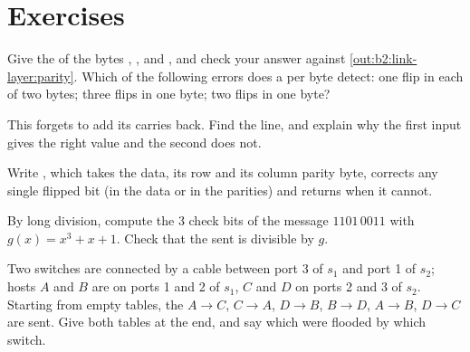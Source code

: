 
\section{Exercises}\label{sec:b2:link-layer:exercises}

\begin{exercise}[$\star$]\label{exo:b2:link-layer:1}
Give the  of the bytes , ,  and , and check your answer
against \cref{out:b2:link-layer:parity}. Which of the following errors does a  per byte detect: one flip in
each of two bytes; three flips in one byte; two flips in one byte?
\end{exercise}

\begin{exercise}[$\star$]\label{exo:b2:link-layer:2}
This  forgets to add its carries back. Find the line, and explain why the first input gives the right value
and the second does not.
\end{exercise}

\begin{exercise}[$\star$]\label{exo:b2:link-layer:3}
Write , which takes the data, its row  and its column parity byte, corrects
any single flipped bit (in the data or in the parities) and returns  when it cannot.
\end{exercise}

\begin{exercise}[$\star$]\label{exo:b2:link-layer:4}
By long division, compute the 3 check bits of the message $1101\,0011$ with $g(x) = x^3 + x + 1$. Check that the 
sent is divisible by $g$.
\end{exercise}

\begin{exercise}[$\star\star$]\label{exo:b2:link-layer:5}
Two switches are connected by a cable between port 3 of $s_1$ and port 1 of $s_2$; hosts $A$ and $B$ are on ports 1
and 2 of $s_1$, $C$ and $D$ on ports 2 and 3 of $s_2$. Starting from empty tables, the  $A \to C$, $C \to A$,
$D \to B$, $B \to D$, $A \to B$, $D \to C$ are sent. Give both tables at the end, and say which  were flooded
by which switch.
\end{exercise}

